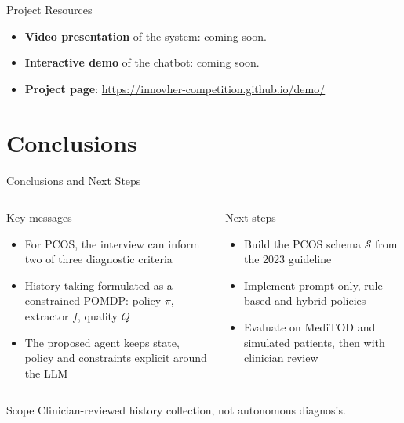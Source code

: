 \documentclass[
aspectratio=169,	%
english,			%
]{DEEclassP}
\begin{document}
\begin{frame}{Project Resources}

\setlstep{0.4cm}{0.1cm}{0cm}
\begin{itemize}
	\item \textbf{Video presentation} of the system: coming soon.
	\item \textbf{Interactive demo} of the chatbot: coming soon.
	\item \textbf{Project page}: \url{https://innovher-competition.github.io/demo/}
\end{itemize}

\end{frame}

\section{Conclusions}

\begin{frame}{Conclusions and Next Steps}

\begin{columns}[T]
\begin{block}{Key messages}
\small
\setlstep{0.05cm}{0cm}{0cm}
\begin{itemize}
	\item For PCOS, the interview can inform two of three diagnostic criteria
	\item History-taking formulated as a constrained POMDP: policy $\pi$, extractor $f$, quality $Q$
	\item The proposed agent keeps state, policy and constraints explicit around the LLM
\end{itemize}
\end{block}
\begin{block}{Next steps}
\small
\setlstep{0.05cm}{0cm}{0cm}
\begin{itemize}
	\item Build the PCOS schema $\mathcal{S}$ from the 2023 guideline
	\item Implement prompt-only, rule-based and hybrid policies
	\item Evaluate on MediTOD and simulated patients, then with clinician review
\end{itemize}
\end{block}
\end{columns}

\vspace{0.1cm}
\begin{alertblock}{Scope}
Clinician-reviewed history collection, not autonomous diagnosis.
\end{alertblock}

\end{frame}
\end{document}
